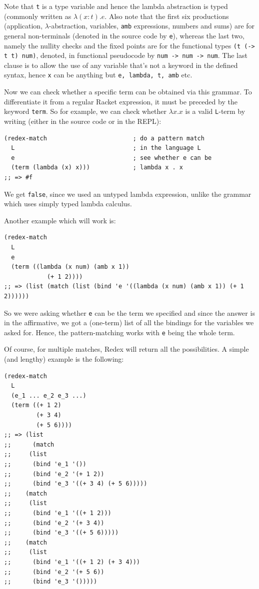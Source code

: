 Note that \texttt{t} is a type variable and hence the lambda abstraction is
typed (commonly written as $ \lambda (x : t).e $. Also note that the first
six productions (application, $\lambda$-abstraction, variables, \texttt{amb}
expressions, numbers and sums) are for general non-terminals (denoted in the
source code by \texttt{e}), whereas the last two, namely the nullity checks
and the fixed points are for the functional types \texttt{(t (-> t t) num)},
denoted, in functional pseudocode by \texttt{num -> num -> num}. The last
clause is to allow the use of any variable that's not a keyword in the
defined syntax, hence \texttt{x} can be anything but \texttt{e, lambda, t, amb}
etc.

Now we can check whether a specific term can be obtained via this grammar.
To differentiate it from a regular Racket expression, it must be preceded
by the keyword \texttt{term}. So for example, we can check whether
$ \lambda x . x $ is a valid \texttt{L}-term by writing (either in the source
code or in the REPL):
{
  \small
\begin{verbatim}
(redex-match                        ; do a pattern match
  L                                 ; in the language L
  e                                 ; see whether e can be
  (term (lambda (x) x)))            ; lambda x . x
;; => #f
\end{verbatim}
}
We get \texttt{false}, since we used an untyped lambda expression, unlike
the grammar which uses simply typed lambda calculus.

Another example which will work is:
{
  \small
\begin{verbatim}
(redex-match
  L
  e
  (term ((lambda (x num) (amb x 1))
            (+ 1 2))))
;; => (list (match (list (bind 'e '((lambda (x num) (amb x 1)) (+ 1 2))))))
\end{verbatim}
}
So we were asking whether \texttt{e} can be the term we specified and
since the answer is in the affirmative, we got a (one-term) list of all the
bindings for the variables we asked for. Hence, the pattern-matching
works with \texttt{e} being the whole term.

Of course, for multiple matches, Redex will return all the possibilities.
A simple (and lengthy) example is the following:
{
  \small
\begin{verbatim}
(redex-match    
  L    
  (e_1 ... e_2 e_3 ...)    
  (term ((+ 1 2)    
         (+ 3 4)    
         (+ 5 6))))    
;; => (list    
;;      (match    
;;     (list    
;;      (bind 'e_1 '())    
;;      (bind 'e_2 '(+ 1 2))    
;;      (bind 'e_3 '((+ 3 4) (+ 5 6)))))    
;;    (match    
;;     (list    
;;      (bind 'e_1 '((+ 1 2)))    
;;      (bind 'e_2 '(+ 3 4))    
;;      (bind 'e_3 '((+ 5 6)))))    
;;    (match    
;;     (list    
;;      (bind 'e_1 '((+ 1 2) (+ 3 4)))    
;;      (bind 'e_2 '(+ 5 6))    
;;      (bind 'e_3 '()))))
\end{verbatim}
}

